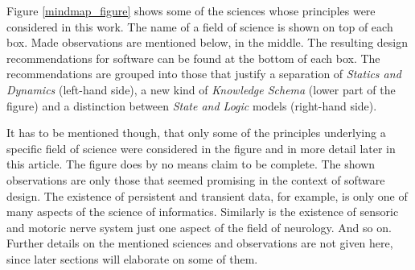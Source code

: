 Figure \ref{mindmap_figure} shows some of the sciences whose principles were
considered in this work. The name of a field of science is shown on top of each
box. Made observations are mentioned below, in the middle. The resulting design
recommendations for software can be found at the bottom of each box. The
recommendations are grouped into those that justify a separation of
\emph{Statics and Dynamics} (left-hand side), a new kind of
\emph{Knowledge Schema} (lower part of the figure) and a distinction between
\emph{State and Logic} models (right-hand side).

It has to be mentioned though, that only some of the principles underlying a
specific field of science were considered in the figure and in more detail later
in this article. The figure does by no means claim to be complete. The shown
observations are only those that seemed promising in the context of software
design. The existence of persistent and transient data, for example, is only
one of many aspects of the science of informatics. Similarly is the existence
of sensoric and motoric nerve system just one aspect of the field of neurology.
And so on. Further details on the mentioned sciences and observations are not
given here, since later sections will elaborate on some of them.
